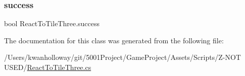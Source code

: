 \subsubsection{\texorpdfstring{success}{success}}
{\footnotesize\ttfamily bool React\+To\+Tile\+Three.\+success}



The documentation for this class was generated from the following file\+:\begin{DoxyCompactItemize}
\item 
/\+Users/kwanholloway/git/5001\+Project/\+Game\+Project/\+Assets/\+Scripts/\+Z-\/\+N\+O\+T U\+S\+E\+D/\hyperlink{_react_to_tile_three_8cs}{React\+To\+Tile\+Three.\+cs}\end{DoxyCompactItemize}
